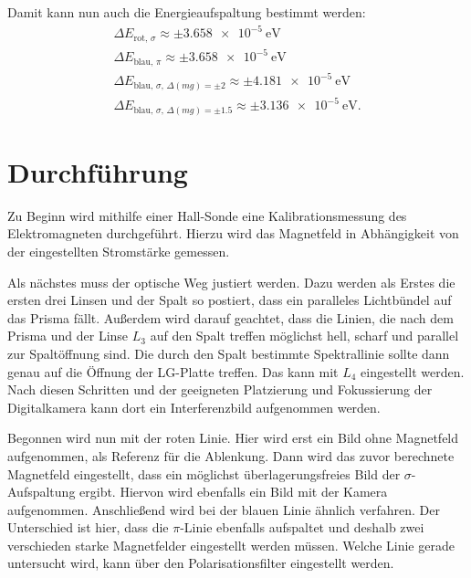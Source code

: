 Damit kann nun auch die Energieaufspaltung bestimmt werden:
\begin{align}
  \Delta E_\text{rot, $\sigma$} \approx \pm\SI{3.658e-5}{\electronvolt}\\
  \Delta E_\text{blau, $\pi$} \approx \pm \SI{3.658e-5}{\electronvolt}\\
  \Delta E_\text{blau, $\sigma$, $\Delta (mg) = \pm 2$} \approx \pm \SI{4.181e-5}{\electronvolt}\\
  \Delta E_\text{blau, $\sigma$, $\Delta (mg) = \pm 1.5$} \approx \pm \SI{3.136e-5}{\electronvolt}.
\end{align}


\section{Durchführung}
\label{sec:Durchführung}

Zu Beginn wird mithilfe einer Hall-Sonde eine Kalibrationsmessung des Elektromagneten durchgeführt. Hierzu wird das Magnetfeld in Abhängigkeit von der eingestellten Stromstärke gemessen.

Als nächstes muss der optische Weg justiert werden.
Dazu werden als Erstes die ersten drei Linsen und der Spalt so postiert, dass ein paralleles Lichtbündel auf das Prisma fällt. Außerdem wird darauf geachtet, dass die Linien, die nach dem Prisma und der Linse $L_3$ auf den Spalt treffen möglichst hell, scharf und parallel zur Spaltöffnung sind. Die durch den Spalt bestimmte Spektrallinie sollte dann genau auf die Öffnung der LG-Platte treffen. Das kann mit $L_4$ eingestellt werden. Nach diesen Schritten und der geeigneten Platzierung und Fokussierung der Digitalkamera kann dort ein Interferenzbild aufgenommen werden.

Begonnen wird nun mit der roten Linie. Hier wird erst ein Bild ohne Magnetfeld aufgenommen, als Referenz für die Ablenkung. Dann wird das zuvor berechnete Magnetfeld eingestellt, dass ein möglichst überlagerungsfreies Bild der $\sigma$-Aufspaltung ergibt. Hiervon wird ebenfalls ein Bild mit der Kamera aufgenommen.
Anschließend wird bei der blauen Linie ähnlich verfahren. Der Unterschied ist hier, dass die $\pi$-Linie ebenfalls aufspaltet und deshalb zwei verschieden starke Magnetfelder eingestellt werden müssen. Welche Linie gerade untersucht wird, kann über den Polarisationsfilter eingestellt werden.
